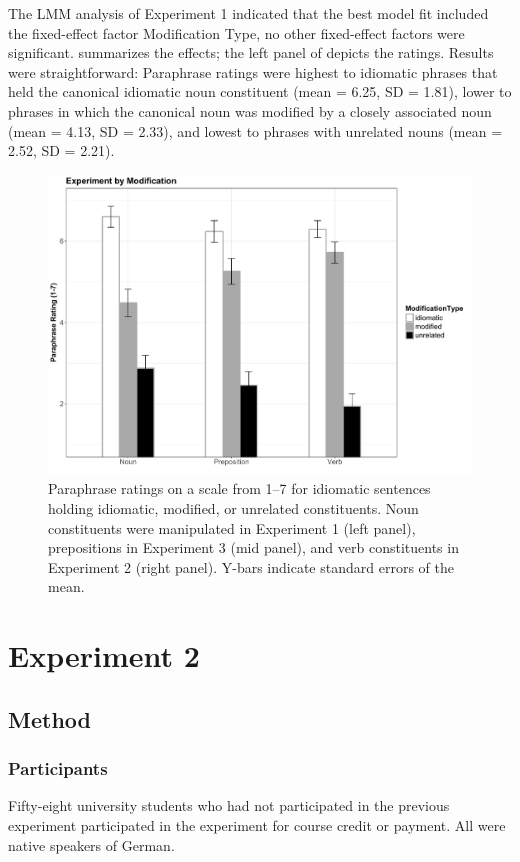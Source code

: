 \documentclass[output=paper]{langsci/langscibook}
\begin{document}
The LMM analysis of Experiment 1 indicated that the best model fit included the fixed-effect factor Modification Type, no other fixed-effect factors were significant.   summarizes the effects; the left panel of  depicts the ratings. Results were straightforward: Paraphrase ratings were highest to idiomatic phrases that held the canonical idiomatic noun constituent (mean = 6.25, SD = 1.81), lower to phrases in which the canonical noun was modified by a closely associated noun (mean = 4.13, SD = 2.33), and lowest to phrases with unrelated nouns (mean = 2.52, SD = 2.21).

\begin{figure}[hbt!]
  \includegraphics[width=\linewidth]{figures/smolka.pdf}
  \caption{Paraphrase ratings on a scale from 1--7 for idiomatic sentences holding idiomatic, modified, or unrelated constituents. Noun constituents were manipulated in Experiment 1 (left panel), prepositions in Experiment 3 (mid panel), and verb constituents in Experiment 2 (right panel). Y-bars indicate standard errors of the mean.}
  \label{fig:chart}
\end{figure}



\section{Experiment 2}

\subsection{Method}

\subsubsection{Participants}
Fifty-eight university students who had not participated in the previous experiment participated in the experiment for course credit or payment. All were native speakers of German. 
\end{document}
